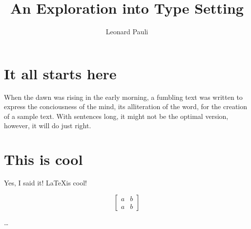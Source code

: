 \documentclass[a4paper,11pt]{article}
\author{Leonard Pauli}
\title{An Exploration into Type Setting}
\begin{document}
\maketitle
\tableofcontents
\section{It all starts here}
When the dawn was rising in the early morning, a fumbling text was written to express the conciousness of the mind, its alliteration of the word, for the creation of a sample text. With sentences long, it might not be the optimal version, however, it will do just right.
\section{This is cool}
Yes, I said it! \LaTeX is cool!

$$\begin{bmatrix}
a & b \\
a & b
\end{bmatrix}$$

\ldots
\end{document}
